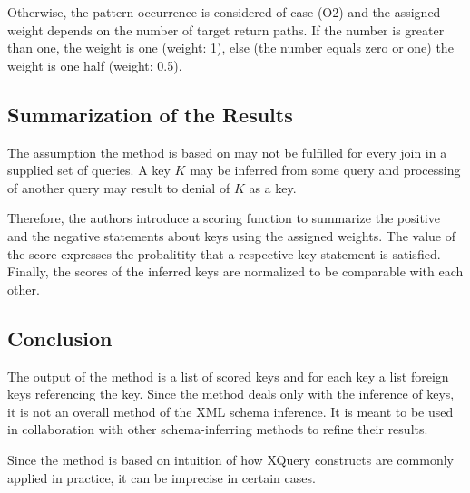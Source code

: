 Otherwise, the pattern occurrence is considered of case (O2) and the assigned weight depends on the number of target return paths. If the number is greater than one, the weight is one (weight: 1), else (the number equals zero or one) the weight is one half (weight: 0.5).

\subsection{Summarization of the Results}

The assumption the method is based on may not be fulfilled for every join in a supplied set of queries. A key $K$ may be inferred from some query and processing of another query may result to denial of $K$ as a key.

Therefore, the authors introduce a scoring function to summarize the positive and the negative statements about keys using the assigned weights. The value of the score expresses the probalitity that a respective key statement is satisfied. Finally, the scores of the inferred keys are normalized to be comparable with each other.

\subsection{Conclusion}
The output of the method is a list of scored keys and for each key a list foreign keys referencing the key. Since the method deals only with the inference of keys, it is not an overall method of the XML schema inference. It is meant to be used in collaboration with other schema-inferring methods to refine their results.

Since the method is based on intuition of how XQuery constructs are commonly applied in practice, it can be imprecise in certain cases.

